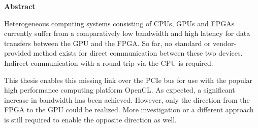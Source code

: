 

\clearemptydoublepage
{}
{}





\vspace*{2cm}
\begin{center}
{\Large \bf Abstract}
\end{center}
\vspace{1cm}


Heterogeneous computing systems consisting of CPUs, GPUs and FPGAs currently suffer from a comparatively low bandwidth and high latency for data transfers between the GPU and the FPGA.
So far, no standard or vendor-provided method exists for direct communication between these two devices.
Indirect communication with a round-trip via the CPU is required.

This thesis enables this missing link over the PCIe bus for use with the popular high performance computing platform OpenCL.
As expected, a significant increase in bandwidth has been achieved.
However, only the direction from the FPGA to the GPU could be realized.
More investigation or a different approach is still required to enable the opposite direction as well.



